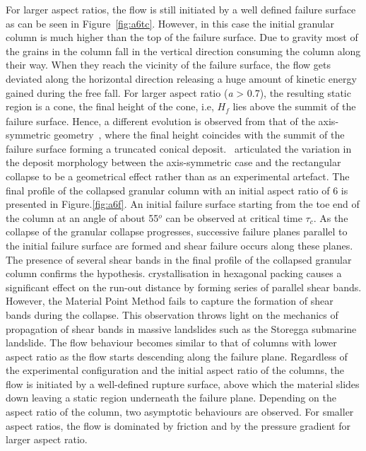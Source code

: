 For larger aspect ratios, the flow is still initiated by a well defined failure 
surface as can be seen in Figure~\ref{fig:a6tc}. However, in this case the 
initial granular column is much higher than the top of the failure surface. Due 
to gravity most of the grains in the column fall in the vertical direction 
consuming the column along their way. When they reach the vicinity of the 
failure surface, the flow gets deviated along the horizontal direction 
releasing a huge amount of kinetic energy gained during the free fall. For 
larger aspect ratio (\textit{a} > 0.7), the resulting static region is a cone, 
the final height of the cone, i.e, $\textit{H}_{\textit{f}}$ lies above the 
summit of the failure surface. Hence, a different evolution is observed from 
that of the axis-symmetric geometry~\citep{Lube2005}, where the final height 
coincides with the summit of the failure surface forming a truncated conical 
deposit.~\citet{Lajeunesse2004} articulated the variation in the deposit 
morphology between the axis-symmetric case and the rectangular collapse to be a 
geometrical effect rather than as an experimental artefact. The final profile 
of the collapsed granular column with an initial aspect ratio of 6 is presented 
in Figure.\ref{fig:a6f}. An initial failure surface starting from the toe end 
of the column at an angle of about 55$^{o}$ can be observed at critical time 
$\tau_{c}$. As the collapse of the granular collapse progresses, successive 
failure planes parallel to the initial failure surface are formed and shear 
failure occurs along these planes. The presence of several shear bands in the 
final profile of the collapsed granular column confirms the hypothesis. 
crystallisation in hexagonal packing causes a significant effect on the run-out 
distance by forming series of parallel shear bands. However, the Material Point 
Method fails to capture the formation of shear bands during the collapse. This 
observation throws light on the mechanics of propagation of shear bands in 
massive landslides such as the Storegga submarine landslide. The flow behaviour 
becomes similar to that of columns with lower aspect ratio as the flow starts 
descending along the failure plane. Regardless of the experimental 
configuration and the initial aspect ratio of the columns, the flow is 
initiated by a well-defined rupture surface, above which the material slides 
down leaving a static region underneath the failure plane. Depending on the 
aspect ratio of the column, two asymptotic behaviours are observed. For smaller 
aspect ratios, the flow is dominated by friction and by the pressure gradient 
for larger aspect ratio.

